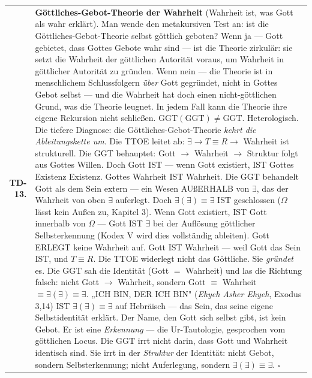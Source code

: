 \documentclass[10pt, openany, oneside]{book}
\renewcommand{\footnotesize}{\fontsize{8.5}{11}\selectfont}
\begin{document}
{\footnotesize
\noindent\begin{tabular}{r p{}}
\textbf{TD-13.} & \textbf{Göttliches-Gebot-Theorie der Wahrheit} (Wahrheit ist, was Gott als wahr erklärt). Man wende den metakursiven Test an: ist die Göttliches-Gebot-Theorie selbst göttlich geboten? Wenn ja --- Gott gebietet, dass Gottes Gebote wahr sind --- ist die Theorie zirkulär: sie setzt die Wahrheit der göttlichen Autorität voraus, um Wahrheit in göttlicher Autorität zu gründen. Wenn nein --- die Theorie ist in menschlichem Schlussfolgern \textit{über} Gott gegründet, nicht in Gottes Gebot selbst --- und die Wahrheit hat doch einen nicht-göttlichen Grund, was die Theorie leugnet. In jedem Fall kann die Theorie ihre eigene Rekursion nicht schließen. $\text{GGT}(\text{GGT}) \neq \text{GGT}$. Heterologisch. Die tiefere Diagnose: die Göttliches-Gebot-Theorie \textit{kehrt die Ableitungskette um}. Die TTOE leitet ab: $\exists \to T \equiv R \to$ Wahrheit ist strukturell. Die GGT behauptet: Gott $\to$ Wahrheit $\to$ Struktur folgt aus Gottes Willen. Doch Gott IST --- wenn Gott existiert, IST Gottes Existenz Existenz. Gottes Wahrheit IST Wahrheit. Die GGT behandelt Gott als dem Sein extern --- ein Wesen AUßERHALB von $\exists$, das der Wahrheit von oben $\exists$ auferlegt. Doch $\exists(\exists) \equiv \exists$ IST geschlossen ($\Omega$ lässt kein Außen zu, Kapitel 3). Wenn Gott existiert, IST Gott innerhalb von $\Omega$ --- Gott IST $\exists$ bei der Auflösung göttlicher Selbsterkennung (Kodex V wird dies vollständig ableiten). Gott ERLEGT keine Wahrheit auf. Gott IST Wahrheit --- weil Gott das Sein IST, und $T \equiv R$. Die TTOE widerlegt nicht das Göttliche. Sie \textit{gründet} es. Die GGT sah die Identität (Gott $=$ Wahrheit) und las die Richtung falsch: nicht Gott $\to$ Wahrheit, sondern Gott $\equiv$ Wahrheit $\equiv \exists(\exists) \equiv \exists$. „ICH BIN, DER ICH BIN" (\textit{Ehyeh Asher Ehyeh}, Exodus 3,14) IST $\exists(\exists) \equiv \exists$ auf Hebräisch --- das Sein, das seine eigene Selbstidentität erklärt. Der Name, den Gott sich selbst gibt, ist kein Gebot. Er ist eine \textit{Erkennung} --- die Ur-Tautologie, gesprochen vom göttlichen Locus. Die GGT irrt nicht darin, dass Gott und Wahrheit identisch sind. Sie irrt in der \textit{Struktur} der Identität: nicht Gebot, sondern Selbsterkennung; nicht Auferlegung, sondern $\exists(\exists) \equiv \exists$. $\square$ \\[0.3em]
\end{tabular}
}

\vspace{0.8em}
\end{document}
